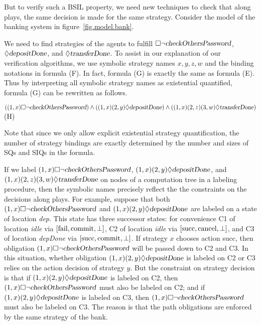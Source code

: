 \documentclass[11pt]{article}
\newcommand{\pfrr}{\Box}
\newcommand{\pevt}{\Diamond}
\begin{document}
\label{reply2.alg.exp} 
But to verify such a BSIL property, we need new techniques to check that along plays, 
the same decision is made for the same strategy.  
Consider the model of the banking system in figure~\ref{fig.model.bank}.  
\begin{figure*}[t] 
\begin{center} 
\caption{Game graph of a banking system} 
\label{fig.model.bank}
\end{center} 
\end{figure*} 
We need to find strategies of the agents to fulfill 
$\pfrr \neg \mbox{\sl checkOthersPassword}$, 
$\pevt \mbox{\sl depositDone}$, and 
$\pevt\mbox{\sl transferDone}$.  
To assist in our explanation of our verification algorithms, 
we use symbolic strategy names $x,y,z,w$ and the binding notations in formula (F).  
In fact, formula (G) is exactly the same as formula (E).  
Thus by interpreting all symbolic strategy names as existential quantified, 
formula (G) can be rewritten as follows.  
\begin{center} \hfill 
$((1,x) \pfrr \neg \mbox{\sl checkOthersPassword})
\wedge ((1,x)(2,y)\pevt \mbox{\sl depositDone})
\wedge ((1,x)(2,z)(3,w)\pevt\mbox{\sl transferDone})$
\hfill (H) 
\end{center}   
Note that since we only allow explicit existential strategy quantification, 
the number of strategy bindings are exactly determined by the number and sizes of SQs and SIQs 
in the formula.  


If we label $(1,x) \pfrr \neg \mbox{\sl checkOthersPassword}$, 
$(1,x)(2,y)\pevt \mbox{\sl depositDone}$, and $(1,x)(2,z)(3,w)\pevt\mbox{\sl transferDone}$
on nodes of a computation tree in a labeling procedure, 
then the symbolic names precisely reflect the the constraints on the decisions along plays. 
For example, 
suppose that both $(1,x) \pfrr \neg \mbox{\sl checkOthersPassword}$ and 
$(1,x)(2,y)\pevt \mbox{\sl depositDone}$ are labeled on 
a state of location {\em dep}.   
This state has three successor states: for convenience 
C1 of location {\em idle} via $[\mbox{\rm fail},\mbox{\rm commit},\perp]$, 
C2 of location {\em idle} via $[\mbox{\rm succ}, \mbox{\rm cancel}, \perp]$, and 
C3 of location {\em depDone} via $[\mbox{\rm succ}, \mbox{\rm commit}, \perp]$.  
If strategy $x$ chooses action succ, then obligation $(1,x) \pfrr \neg \mbox{\sl checkOthersPassword}$ 
will be passed down to C2 and C3.  
In this situation, 
whether obligation $(1,x)(2,y)\pevt \mbox{\sl depositDone}$ 
is labeled on C2 or C3 relies on the action decision of strategy $y$.  
But the constraint on strategy decision is that 
if $(1,x)(2,y)\pevt \mbox{\sl depositDone}$ is labeled on C2, 
then $(1,x) \pfrr \neg \mbox{\sl checkOthersPassword}$ must also be labeled on C2; 
and if  $(1,x)(2,y)\pevt \mbox{\sl depositDone}$ is labeled on C3, 
then $(1,x) \pfrr \neg \mbox{\sl checkOthersPassword}$ must also be labeled on C3.  
The reason is that the path obligations are enforced by the same strategy of the bank.   
\end{document}
